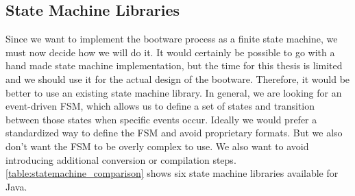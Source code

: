 \subsection{State Machine Libraries}
\label{implementation:selecting:statemachine}

Since we want to implement the bootware process as a finite state machine, we must now decide how we will do it.
It would certainly be possible to go with a hand made state machine implementation, but the time for this thesis is limited and we should use it for the actual design of the bootware.
Therefore, it would be better to use an existing state machine library.
In general, we are looking for an event-driven FSM, which allows us to define a set of states and transition between those states when specific events occur.
Ideally we would prefer a standardized way to define the FSM and avoid proprietary formats.
But we also don't want the FSM to be overly complex to use.
We also want to avoid introducing additional conversion or compilation steps.
\autoref{table:statemachine_comparison} shows six state machine libraries available for Java.

